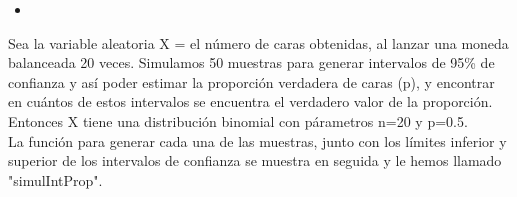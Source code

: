 \documentclass[12pt,letterpaper]{article}\usepackage[]{graphicx}\usepackage[]{color}
\begin{document}
\begin{itemize}
  \item {}
\end{itemize}
Sea la variable aleatoria X = el n\'umero de caras obtenidas, al lanzar una moneda balanceada 20 veces. Simulamos 50 muestras para generar intervalos de 95\% de confianza y as\'i poder estimar la proporci\'on verdadera de caras (p), y encontrar en cu\'antos de estos intervalos se encuentra el verdadero valor de la proporci\'on.\\

Entonces X tiene una distribuci\'on binomial con p\'arametros n=20 y p=0.5.\\

La funci\'on para generar cada una de las muestras, junto con los l\'imites inferior y superior de los intervalos de confianza se muestra en seguida y le hemos llamado "simulIntProp". 
\end{document}

